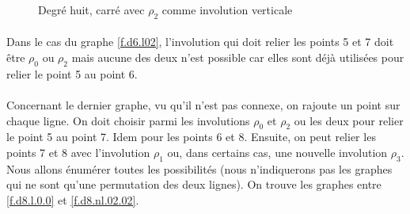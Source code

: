 \begin{figure}[H]
  \begin{center}
  \end{center}
  \caption{Degré huit, carré avec $\rho_2$ comme involution verticale}
  \label{f.d8.l2.l}
\end{figure}

\paragraph{}
Dans le cas du graphe \ref{f.d6.l02}, l'involution qui doit relier les points 5 et 7 doit être $\rho_0$ ou $\rho_2$ mais aucune des deux n'est possible car elles sont déjà utilisées pour relier le point 5 au point 6.

\paragraph{}
Concernant le dernier graphe, vu qu'il n'est pas connexe, on rajoute un point sur chaque ligne. On doit choisir parmi les involutions $\rho_0$ et $\rho_2$ ou les deux pour relier le point 5 au point 7. Idem pour les points 6 et 8. Ensuite, on peut relier les points 7 et 8 avec l'involution $\rho_1$ ou, dans certains cas, une nouvelle involution $\rho_3$. Nous allons énumérer toutes les possibilités (nous n'indiquerons pas les graphes qui ne sont qu'une permutation des deux lignes). On trouve les graphes entre \ref{f.d8.l.0.0} et \ref{f.d8.nl.02.02}.

